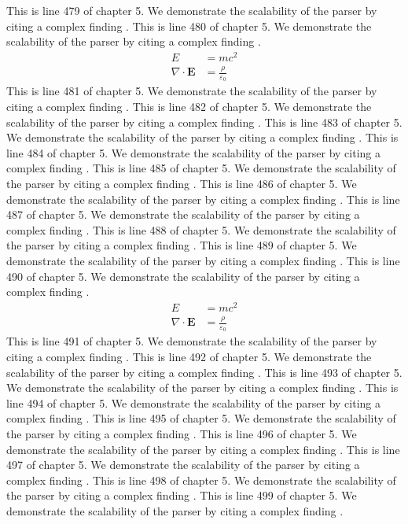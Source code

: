 This is line 479 of chapter 5. We demonstrate the scalability of the parser by citing a complex finding \cite{ref5_479}.
This is line 480 of chapter 5. We demonstrate the scalability of the parser by citing a complex finding \cite{ref5_480}.
\begin{align*}
  E &= mc^2 \\
  \nabla \cdot \mathbf{E} &= \frac{\rho}{\varepsilon_0}
\end{align*}
This is line 481 of chapter 5. We demonstrate the scalability of the parser by citing a complex finding \cite{ref5_481}.
This is line 482 of chapter 5. We demonstrate the scalability of the parser by citing a complex finding \cite{ref5_482}.
This is line 483 of chapter 5. We demonstrate the scalability of the parser by citing a complex finding \cite{ref5_483}.
This is line 484 of chapter 5. We demonstrate the scalability of the parser by citing a complex finding \cite{ref5_484}.
This is line 485 of chapter 5. We demonstrate the scalability of the parser by citing a complex finding \cite{ref5_485}.
This is line 486 of chapter 5. We demonstrate the scalability of the parser by citing a complex finding \cite{ref5_486}.
This is line 487 of chapter 5. We demonstrate the scalability of the parser by citing a complex finding \cite{ref5_487}.
This is line 488 of chapter 5. We demonstrate the scalability of the parser by citing a complex finding \cite{ref5_488}.
This is line 489 of chapter 5. We demonstrate the scalability of the parser by citing a complex finding \cite{ref5_489}.
This is line 490 of chapter 5. We demonstrate the scalability of the parser by citing a complex finding \cite{ref5_490}.
\begin{align*}
  E &= mc^2 \\
  \nabla \cdot \mathbf{E} &= \frac{\rho}{\varepsilon_0}
\end{align*}
This is line 491 of chapter 5. We demonstrate the scalability of the parser by citing a complex finding \cite{ref5_491}.
This is line 492 of chapter 5. We demonstrate the scalability of the parser by citing a complex finding \cite{ref5_492}.
This is line 493 of chapter 5. We demonstrate the scalability of the parser by citing a complex finding \cite{ref5_493}.
This is line 494 of chapter 5. We demonstrate the scalability of the parser by citing a complex finding \cite{ref5_494}.
This is line 495 of chapter 5. We demonstrate the scalability of the parser by citing a complex finding \cite{ref5_495}.
This is line 496 of chapter 5. We demonstrate the scalability of the parser by citing a complex finding \cite{ref5_496}.
This is line 497 of chapter 5. We demonstrate the scalability of the parser by citing a complex finding \cite{ref5_497}.
This is line 498 of chapter 5. We demonstrate the scalability of the parser by citing a complex finding \cite{ref5_498}.
This is line 499 of chapter 5. We demonstrate the scalability of the parser by citing a complex finding \cite{ref5_499}.
